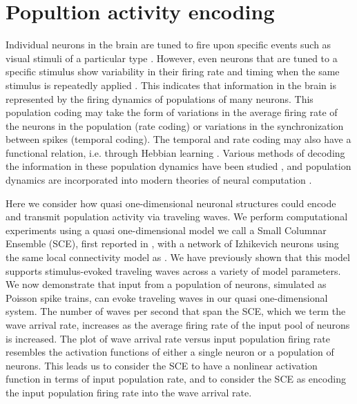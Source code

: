
\chapter{Popultion activity encoding }

Individual neurons in the brain are tuned to fire upon specific events such as visual stimuli of a particular type \citep{Hubel1962} .
However, even neurons that are tuned to a specific stimulus show variability in their firing rate and timing when the same stimulus is repeatedly applied \citep{Georgopoulos1982}\citep{Newsome1989}.
This indicates that information in the brain is represented by the firing dynamics of populations of many neurons.
This population coding may take the form of variations in the average firing rate of the neurons in the population (rate coding) or variations in the synchronization between spikes (temporal coding).
The temporal and rate coding may also have a functional relation, i.e. through Hebbian learning \citep{Basawaraj2019}.
Various methods of decoding the information in these population dynamics have been studied \citep{Deneve1999}\citep{Xu2019}, and population dynamics are incorporated into modern theories of neural computation \citep{Pitkow2017}\citep{Nadeau2020}.

Here we consider how quasi one-dimensional neuronal structures could encode and transmit population activity via traveling waves.
We perform computational experiments using a quasi one-dimensional model we call a Small Columnar Ensemble (SCE), first reported in , with a network of Izhikevich neurons \citep{izhikevich2003} using the same local connectivity model as \citep{maass2002}.
We have previously shown that this model supports stimulus-evoked traveling waves across a variety of model parameters.
We now demonstrate that input from a population of neurons, simulated as Poisson spike trains, can evoke traveling waves in our quasi one-dimensional system.
The number of waves per second that span the SCE, which we term the wave arrival rate, increases as the average firing rate of the input pool of neurons is increased.
The plot of wave arrival rate versus input population firing rate resembles the activation functions of either a single neuron or a population of neurons.
This leads us to consider the SCE to have a nonlinear activation function in terms of input population rate, and to consider the SCE as encoding the input population firing rate into the wave arrival rate.

